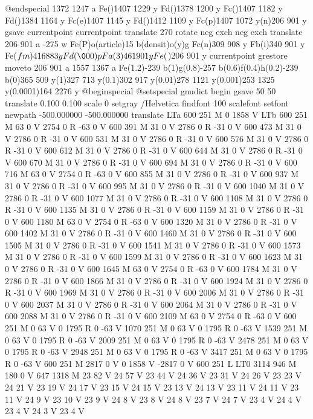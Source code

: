 @endspecial
1372 1247 a Fe()1407 1229 y Fd()1378 1200 y Fc()1407
1182 y Fd()1384 1164 y Fc(e)1407 1145 y Fd()1412
1109 y Fc(p)1407 1072 y(n)206 901 y
 gsave currentpoint currentpoint translate 270 rotate neg exch neg
exch translate
 206 901 a -275 w
Fe(P)o(article)15 b(densit)o(y)g Fc(n)309 908 y Fb(i)340
901 y Fe(\(fm)416 883 y Fd(\000)p Fa(3)461 901 y Fe(\))206
901 y
 currentpoint grestore moveto
 206 901 a 1557 1367 a Fe(1.2)-239 b(1)g(0.8)-257
b(0.6)f(0.4)h(0.2)-239 b(0)365 509 y(1)327 713 y(0.1)302
917 y(0.01)278 1121 y(0.001)253 1325 y(0.0001)164 2276
y @beginspecial @setspecial
 gnudict begin gsave 50 50 translate 0.100 0.100 scale 0 setgray /Helvetica
findfont 100 scalefont setfont newpath -500.000000 -500.000000 translate
LTa 600 251 M 0 1858 V LTb 600 251 M 63 0 V 2754 0 R -63 0 V 600 391
M 31 0 V 2786 0 R -31 0 V 600 473 M 31 0 V 2786 0 R -31 0 V 600 531
M 31 0 V 2786 0 R -31 0 V 600 576 M 31 0 V 2786 0 R -31 0 V 600 612
M 31 0 V 2786 0 R -31 0 V 600 644 M 31 0 V 2786 0 R -31 0 V 600 670
M 31 0 V 2786 0 R -31 0 V 600 694 M 31 0 V 2786 0 R -31 0 V 600 716
M 63 0 V 2754 0 R -63 0 V 600 855 M 31 0 V 2786 0 R -31 0 V 600 937
M 31 0 V 2786 0 R -31 0 V 600 995 M 31 0 V 2786 0 R -31 0 V 600 1040
M 31 0 V 2786 0 R -31 0 V 600 1077 M 31 0 V 2786 0 R -31 0 V 600 1108
M 31 0 V 2786 0 R -31 0 V 600 1135 M 31 0 V 2786 0 R -31 0 V 600 1159
M 31 0 V 2786 0 R -31 0 V 600 1180 M 63 0 V 2754 0 R -63 0 V 600 1320
M 31 0 V 2786 0 R -31 0 V 600 1402 M 31 0 V 2786 0 R -31 0 V 600 1460
M 31 0 V 2786 0 R -31 0 V 600 1505 M 31 0 V 2786 0 R -31 0 V 600 1541
M 31 0 V 2786 0 R -31 0 V 600 1573 M 31 0 V 2786 0 R -31 0 V 600 1599
M 31 0 V 2786 0 R -31 0 V 600 1623 M 31 0 V 2786 0 R -31 0 V 600 1645
M 63 0 V 2754 0 R -63 0 V 600 1784 M 31 0 V 2786 0 R -31 0 V 600 1866
M 31 0 V 2786 0 R -31 0 V 600 1924 M 31 0 V 2786 0 R -31 0 V 600 1969
M 31 0 V 2786 0 R -31 0 V 600 2006 M 31 0 V 2786 0 R -31 0 V 600 2037
M 31 0 V 2786 0 R -31 0 V 600 2064 M 31 0 V 2786 0 R -31 0 V 600 2088
M 31 0 V 2786 0 R -31 0 V 600 2109 M 63 0 V 2754 0 R -63 0 V 600 251
M 0 63 V 0 1795 R 0 -63 V 1070 251 M 0 63 V 0 1795 R 0 -63 V 1539 251
M 0 63 V 0 1795 R 0 -63 V 2009 251 M 0 63 V 0 1795 R 0 -63 V 2478 251
M 0 63 V 0 1795 R 0 -63 V 2948 251 M 0 63 V 0 1795 R 0 -63 V 3417 251
M 0 63 V 0 1795 R 0 -63 V 600 251 M 2817 0 V 0 1858 V -2817 0 V 600
251 L LT0 3114 946 M 180 0 V 647 1318 M 23 82 V 24 57 V 23 44 V 24
36 V 23 31 V 24 26 V 23 23 V 24 21 V 23 19 V 24 17 V 23 15 V 24 15
V 23 13 V 24 13 V 23 11 V 24 11 V 23 11 V 24 9 V 23 10 V 23 9 V 24
8 V 23 8 V 24 8 V 23 7 V 24 7 V 23 4 V 24 4 V 23 4 V 24 3 V 23 4 V
